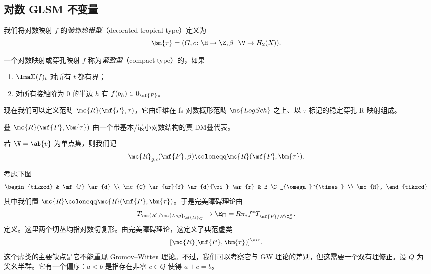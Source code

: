 \subsection{对数 GLSM 不变量}%
\label{sub:Log GLSM invariants}

\begin{defn}
    我们将对数映射 \(f\) 的\textit{装饰热带型}（decorated tropical type）定义为
    \[ \bm{\tau} = (G, c \colon \H \to \Z, \beta \colon \V \to H_2(X)). \]
\end{defn}

\begin{defn}
    一个对数映射或穿孔映射 \(f\) 称为\textit{紧致型}（compact type）的，如果
    \begin{enumerate}
        \item \(\Ima \Sigma(f)_t\) 对所有 \(t\) 都有界；
        \item 对所有接触阶为 \(0\) 的半边 \(h\) 有 \(f(p_h) \in 0_{\mf{P}}\)。
    \end{enumerate}
\end{defn}

现在我们可以定义范畴 \(\mc{R}(\mf{P}, \tau)\)，它由纤维在 fs 对数概形范畴 \(\ms{LogSch}\) 之上、以 \(\tau\) 标记的稳定穿孔 R-映射组成。

\begin{thm}
    叠 \(\mc{R}(\mf{P},\bm{\tau})\) 由一个带基本/最小对数结构的真 DM叠代表。
\end{thm}

\begin{rmk}
    若 \(\V = \ab\{v\}\) 为单点集，则我们记
    \[ \mc{R}_{g, c}(\mf{P}, \beta) \coloneqq \mc{R}(\mf{P}, \bm{\tau}). \]
\end{rmk}

考虑下图
\begin{equation*}
\begin{tikzcd}
    & \mf{P} \ar{d} \\
    \mc{C} \ar{ur}{f} \ar{d}{\pi} \ar{r} & B \C_{\omega}^{\times} \\
    \mc{R},
\end{tikzcd}
\end{equation*}
其中我们置 \(\mc{R} \coloneqq \mc{R}(\mf{P}, \bm{\tau})\)。于是完美障碍理论由
\[ T_{\mc{R}/\ms{Log}_{\mf{M}_G}} \to \E_{\square} = R \pi_* f^* T_{\mf{P}/B\C_{\omega}^{\times}}. \]
定义。这里两个切丛均指对数切复形。由完美障碍理论，这定义了典范虚类
\[ [\mc{R}(\mf{P}, \bm{\tau})]^{\vir}. \]
这个虚类的主要缺点是它不能重现 Gromov–Witten 理论。不过，我们可以考察它与 GW 理论的差别，但这需要一个双有理修正。设 \(Q\) 为尖幺半群。它有一个偏序：\(a < b\) 是指存在非零 \(c \in Q\) 使得 \(a+c = b\)。

